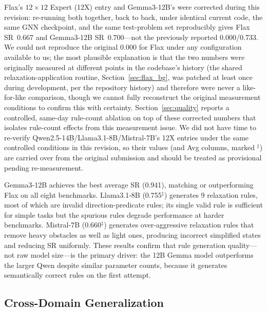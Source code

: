 \documentclass[letterpaper, 10pt, journal, twoside]{IEEEtran}
\newcommand{\sref}[1]{Section~\ref{#1}}
\newcommand{\baseline}{Flax\xspace}
\begin{document}
\baseline's $12{\times}12$ Expert (12X) entry and Gemma3-12B's were corrected during this revision: re-running both together, back to back, under identical current code, the same GNN checkpoint, and the same test-problem set reproducibly gives \baseline SR~0.667 and Gemma3-12B SR~0.700---not the previously reported 0.000/0.733.
We could not reproduce the original 0.000 for \baseline under any configuration available to us; the most plausible explanation is that the two numbers were originally measured at different points in the codebase's history (the shared relaxation-application routine, \sref{sec:flax_bg}, was patched at least once during development, per the repository history) and therefore were never a like-for-like comparison, though we cannot fully reconstruct the original measurement conditions to confirm this with certainty.
\sref{sec:quality} reports a controlled, same-day rule-count ablation on top of these corrected numbers that isolates rule-count effects from this measurement issue.
We did not have time to re-verify Qwen2.5-14B/Llama3.1-8B/Mistral-7B's 12X entries under the same controlled conditions in this revision, so their values (and Avg columns, marked $^\ddagger$) are carried over from the original submission and should be treated as provisional pending re-measurement.

Gemma3-12B achieves the best average SR (0.941), matching or outperforming \baseline on all eight benchmarks.
Llama3.1-8B (0.755$^\ddagger$) generates 9 relaxation rules, most of which are invalid direction-predicate rules; its single valid rule is sufficient for simple tasks but the spurious rules degrade performance at harder benchmarks.
Mistral-7B (0.660$^\ddagger$) generates over-aggressive relaxation rules that remove heavy obstacles as well as light ones, producing incorrect simplified states and reducing SR uniformly.
These results confirm that rule generation quality---not raw model size---is the primary driver: the 12B Gemma model outperforms the larger Qwen despite similar parameter counts, because it generates semantically correct rules on the first attempt.

\subsection{Cross-Domain Generalization}
\label{sec:crossdomain_results}
\end{document}
